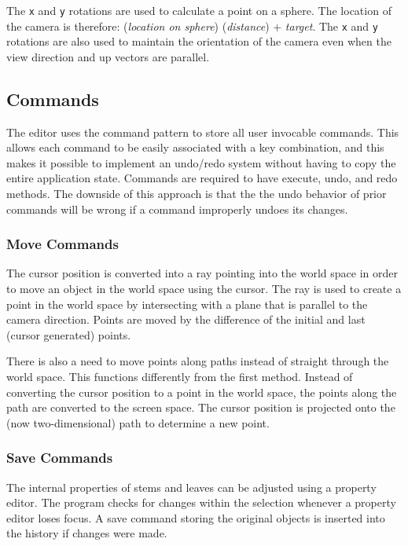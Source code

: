 \documentclass[10pt]{article}
\begin{document}
The \texttt{x} and \texttt{y} rotations are used to calculate a point on a sphere. The location of the camera is therefore: (\textit{location on sphere}) (\textit{distance}) + \textit{target}. The \texttt{x} and \texttt{y} rotations are also used to maintain the orientation of the camera even when the view direction and up vectors are parallel.

\subsection{Commands}

The editor uses the command pattern to store all user invocable commands. This allows each command to be easily associated with a key combination, and this makes it possible to implement an undo/redo system without having to copy the entire application state. Commands are required to have execute, undo, and redo methods. The downside of this approach is that the the undo behavior of prior commands will be wrong if a command improperly undoes its changes.

\subsubsection{Move Commands}

The cursor position is converted into a ray pointing into the world space in order to move an object in the world space using the cursor. The ray is used to create a point in the world space by intersecting with a plane that is parallel to the camera direction. Points are moved by the difference of the initial and last (cursor generated) points.

There is also a need to move points along paths instead of straight through the world space. This functions differently from the first method. Instead of converting the cursor position to a point in the world space, the points along the path are converted to the screen space. The cursor position is projected onto the (now two-dimensional) path to determine a new point.

\subsubsection{Save Commands}

The internal properties of stems and leaves can be adjusted using a property editor. The program checks for changes within the selection whenever a property editor loses focus. A save command storing the original objects is inserted into the history if changes were made.
\end{document}
